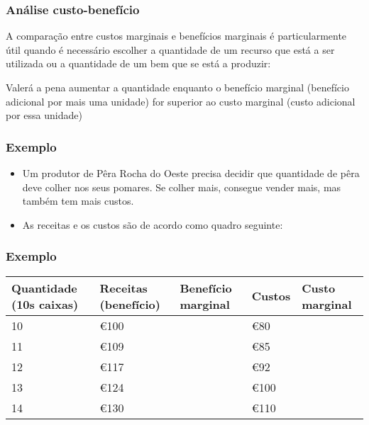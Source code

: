 \begin{frame}
	\frametitle{An\'alise custo-benef\'icio}

	A compara\c c\~ao entre custos marginais e benef\'icios marginais \'e particularmente \'util quando \'e necess\'ario escolher a quantidade de um recurso que est\'a a ser utilizada ou a quantidade de um bem que se est\'a a produzir:

	\vspace{0.2cm}

	\pause

	Valer\'a a pena aumentar a quantidade enquanto o benef\'icio marginal (benef\'icio adicional por mais uma unidade) for superior ao custo marginal (custo adicional por essa unidade)

\end{frame}

\begin{frame}
	\frametitle{Exemplo}

	\begin{itemize}
		\item Um produtor de P\^era Rocha do Oeste precisa decidir que quantidade de p\^era deve colher nos seus pomares. Se colher mais, consegue vender mais, mas tamb\'em tem mais custos.
		\item As receitas e os custos s\~ao de acordo como quadro seguinte:
	\end{itemize}

\end{frame}

\begin{frame}
	\frametitle{Exemplo}

	\begin{table}
		\begin{tabular}{p{1.8cm}p{1.8cm}p{1.8cm}p{1.8cm}p{1.8cm}}
			Quantidade (10s caixas) & Receitas (benef\'icio) & Benef\'icio marginal & Custos & Custo marginal \\
			\hline\hline
			10 & \euro 100 & & \euro 80 & \\
			11 & \euro 109 & & \euro 85 & \\
			12 & \euro 117 & & \euro 92 & \\
			13 & \euro 124 & & \euro 100 & \\
			14 & \euro 130 & & \euro 110 & 
		\end{tabular}
	\end{table}
\end{frame}

